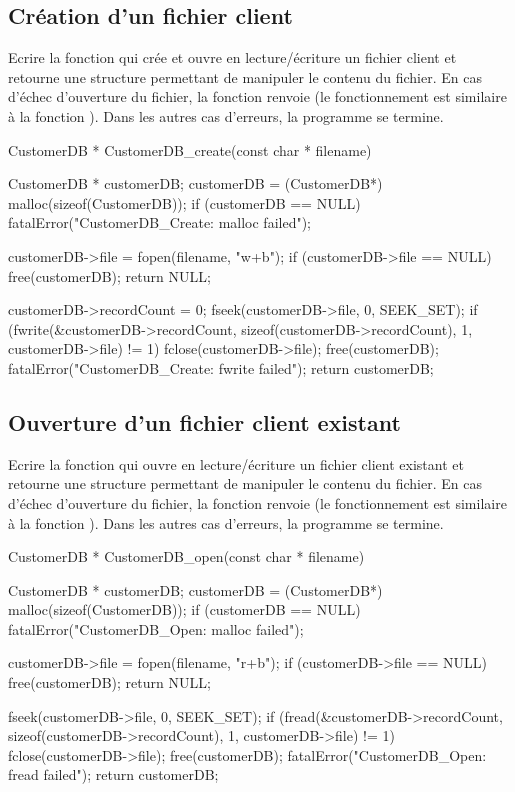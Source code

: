 \subsection{Création d'un fichier client}

Ecrire la fonction  qui crée et ouvre en lecture/écriture un fichier client et retourne une structure permettant de manipuler le contenu du fichier. En cas d'échec d'ouverture du fichier, la fonction renvoie  (le fonctionnement est similaire à la fonction ). Dans les autres cas d'erreurs, la programme se termine.

\begin{csourcecorrection}
CustomerDB * CustomerDB_create(const char * filename) {
    CustomerDB * customerDB;
    customerDB = (CustomerDB*) malloc(sizeof(CustomerDB));
    if (customerDB == NULL)
        fatalError("CustomerDB_Create: malloc failed");

    customerDB->file = fopen(filename, "w+b");
    if (customerDB->file == NULL) {
        free(customerDB);
        return NULL;
    }

    customerDB->recordCount = 0;
    fseek(customerDB->file, 0, SEEK_SET);
    if (fwrite(&customerDB->recordCount, sizeof(customerDB->recordCount), 1, customerDB->file) != 1) {
        fclose(customerDB->file);
        free(customerDB);
        fatalError("CustomerDB_Create: fwrite failed");
    }
    return customerDB;
}
\end{csourcecorrection}

\subsection{Ouverture d'un fichier client existant}

Ecrire la fonction  qui ouvre en lecture/écriture un fichier client existant et retourne une structure permettant de manipuler le contenu du fichier. En cas d'échec d'ouverture du fichier, la fonction renvoie  (le fonctionnement est similaire à la fonction ).  Dans les autres cas d'erreurs, la programme se termine.

\begin{csourcecorrection}
CustomerDB * CustomerDB_open(const char * filename) {
    CustomerDB * customerDB;
    customerDB = (CustomerDB*) malloc(sizeof(CustomerDB));
    if (customerDB == NULL)
        fatalError("CustomerDB_Open: malloc failed");

    customerDB->file = fopen(filename, "r+b");
    if (customerDB->file == NULL) {
        free(customerDB);
        return NULL;
    }

    fseek(customerDB->file, 0, SEEK_SET);
    if (fread(&customerDB->recordCount, sizeof(customerDB->recordCount), 1, customerDB->file) != 1) {
        fclose(customerDB->file);
        free(customerDB);
        fatalError("CustomerDB_Open: fread failed");
    }
    return customerDB;
}
\end{csourcecorrection}

